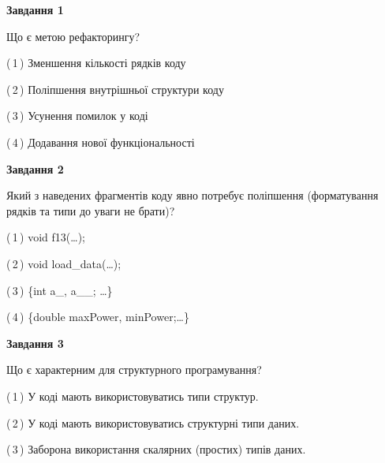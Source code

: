 \documentclass[10pt, ukrainian]{article}
\begin{document}
{
\begin {large}
{\begin {center}\textbf{Завдання 1}\end {center}}\par
Що є метою рефакторингу?\par
\vspace{2mm}



(\,1\,) Зменшення кількості рядків коду%



(\,2\,) Поліпшення внутрішньої структури коду%



(\,3\,) Усунення помилок у коді%



(\,4\,) Додавання нової функціональності%


{\begin {center}\textbf{Завдання 2}\end {center}}\par
Який з наведених фрагментів коду явно потребує поліпшення (форматування рядків та типи до уваги не брати)?\par
\vspace{2mm}



(\,1\,) void f13(…);%



(\,2\,) void load\_data(…);%



(\,3\,) \{int a\_, a\_\_; …\}%



(\,4\,) \{double maxPower, minPower;…\} %


{\begin {center}\textbf{Завдання 3}\end {center}}\par
Що є характерним для структурного програмування?\par
\vspace{2mm}



(\,1\,) У коді мають використовуватись типи структур. %



(\,2\,) У коді мають використовуватись структурні типи даних. %



(\,3\,) Заборона використання скалярних (простих) типів даних. %




\end{large}}
\end{document}
